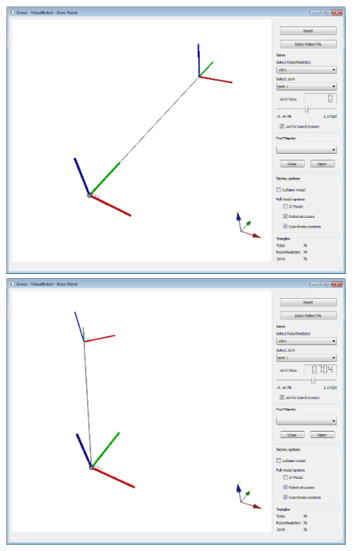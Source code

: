 \documentclass{book}
\begin{document}
\begin{figure}[H]
	\centering
	\begin{minipage} {.45\linewidth}
	  \includegraphics[width=\linewidth]{Tutorial3a}
	\end{minipage}
	\begin{minipage} {.45\linewidth}
	  \includegraphics[width=\linewidth]{Tutorial3b}
	\end{minipage}
\end{figure}

\par
\end{document}
